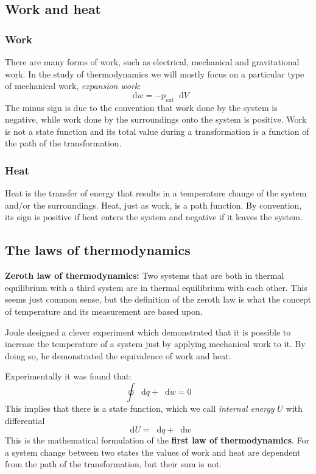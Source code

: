 \documentclass[12pt,a4paper]{report}
\newcommand*\diff{\mathop{}\!\mathrm{d}}
\begin{document}
   \subsection*{Work and heat}
   \subsubsection*{Work}
   There are many forms of work, such as electrical, mechanical and gravitational work. In the study of thermodynamics we will mostly focus on a particular type of mechanical work, \textit{expansion work}:
   \begin{equation*}
   \diff w=-p_{\mathrm{ext}}\diff V
   \end{equation*}
   The minus sign is due to the convention that work done by the system is negative, while work done by the surroundings onto the system is positive. Work is not a state function and its total value during a transformation is a function of the path of the transformation.
   \subsubsection*{Heat}
   Heat is the transfer of energy that results in a temperature change of the system and/or the surroundings. 
   Heat, just as work, is a path function. By convention, its sign is positive if heat enters the system and negative if it leaves the system.
   \subsection*{The laws of thermodynamics}
   \textbf{Zeroth law of thermodynamics:} Two systems that are both in thermal equilibrium with a third system are in thermal equilibrium with each other. This seems just common sense, but the definition of the zeroth law is what the concept of temperature and its measurement are based upon.
   
   Joule designed a clever experiment which demonstrated that it is possible to increase the temperature of a system just by applying mechanical work to it. By doing so, he demonstrated the equivalence of work and heat.
   
   Experimentally it was found that:
   \begin{equation*}
   \oint\diff q+\diff w=0
   \end{equation*}
   This implies that there is a state function, which we call \textit{internal energy} $U$ with differential 
   \begin{equation*}
   \diff U=\diff q+\diff w
   \end{equation*}
   This is the mathematical formulation of the \textbf{first law of thermodynamics}.
   For a system change between two states the values of work and heat are dependent from the path of the transformation, but their sum is not. 
    
\end{document}
